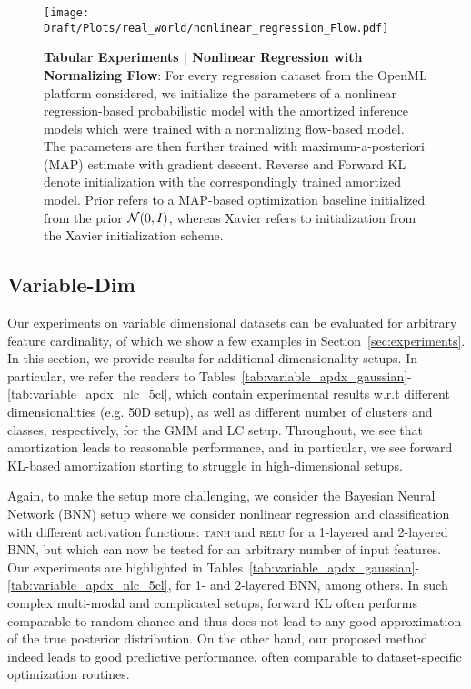 \begin{figure}
    \centering
    \texttt{[image: Draft/Plots/real\_world/nonlinear\_regression\_Flow.pdf]}
    \caption{\textbf{Tabular Experiments $|$ Nonlinear Regression with Normalizing Flow}: For every regression dataset from the OpenML platform considered, we initialize the parameters of a nonlinear regression-based probabilistic model with the amortized inference models which were trained with a normalizing flow-based model. The parameters are then further trained with maximum-a-posteriori (MAP) estimate with gradient descent. Reverse and Forward KL denote initialization with the correspondingly trained amortized model. Prior refers to a MAP-based optimization baseline initialized from the prior ${\mathcal{N}}(0, I)$, whereas Xavier refers to initialization from the Xavier initialization scheme.}
    \vspace{-5mm}
\label{fig:regression_nonlinear_flow}
\end{figure}
\subsection{Variable-Dim}
\label{appdx:results_maxdim}
Our experiments on variable dimensional datasets can be evaluated for arbitrary feature cardinality, of which we show a few examples in Section~\ref{sec:experiments}. In this section, we provide results for additional dimensionality setups. In particular, we refer the readers to Tables~\ref{tab:variable_apdx_gaussian}-\ref{tab:variable_apdx_nlc_5cl}, which contain experimental results w.r.t different dimensionalities (e.g. 50D setup), as well as different number of clusters and classes, respectively, for the GMM and LC setup. Throughout, we see that amortization leads to reasonable performance, and in particular, we see forward KL-based amortization starting to struggle in high-dimensional setups.

Again, to make the setup more challenging, we consider the Bayesian Neural Network (BNN) setup where we consider nonlinear regression and classification with different activation functions: \textsc{tanh} and \textsc{relu} for a 1-layered and 2-layered BNN, but which can now be tested for an arbitrary number of input features. Our experiments are highlighted in Tables~\ref{tab:variable_apdx_gaussian}-\ref{tab:variable_apdx_nlc_5cl}, for 1- and 2-layered BNN, among others. In such complex multi-modal and complicated setups, forward KL often performs comparable to random chance and thus does not lead to any good approximation of the true posterior distribution. On the other hand, our proposed method indeed leads to good predictive performance, often comparable to dataset-specific optimization routines.

